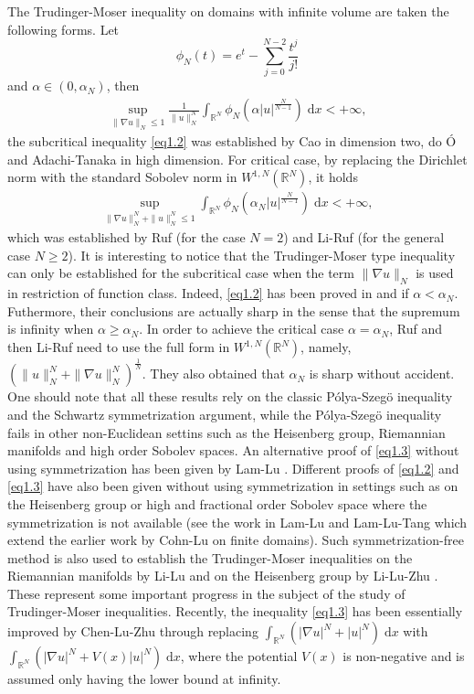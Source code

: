 \documentclass[11pt]{article}
\theoremstyle{plain}
\numberwithin{equation}{section}
\newcommand{\R}{\mathbb{R}}
\begin{document}
The Trudinger-Moser inequality on domains with infinite volume are taken the
following forms.
 Let
$$
\phi_{N}(t)=e^{t}-\sum\limits_{j=0}^{N-2}\frac{t^{j}}{j!}
$$
and $\alpha\in(0,\alpha_{N})$, then
\begin{align}
    \sup\limits_{\|\nabla u\|_{N}\leq 1}\frac{1}{\|u\|_{N}^{N}}\int_{\R^{N}}\phi_{N}(\alpha\lvert u\rvert^{\frac{N}{N-1}})\;\mathrm{d}x<+\infty,\label{eq1.2}
\end{align}
the subcritical inequality \eqref{eq1.2} was established by Cao \cite{Cao-1992} in dimension two, do \'{O} \cite{do-1997} and Adachi-Tanaka \cite{Adachi-Tanaka-2000} in high dimension. For critical case,  by replacing the Dirichlet norm with the standard Sobolev
norm in $W^{1, N}(\R^{N})$, it holds
\begin{align}
    \sup\limits_{\|\nabla u\|_{N}^{N}+\|u\|_{N}^{N}\leq 1}\int_{\R^{N}}\phi_{N}(\alpha_N\lvert u\rvert^{\frac{N}{N-1}})\;\mathrm{d}x<+\infty,\label{eq1.3}
\end{align}
which was established by Ruf \cite{Ruf-2005}(for the case $N=2$) and Li-Ruf \cite{Li-Ruf-2008}(for the general case $N\geq2$). It is interesting to notice that the Trudinger-Moser type inequality can only be established for the subcritical case when  the term $\|\nabla u\|_{N}$ is  used in restriction of function class. Indeed, \eqref{eq1.2} has been proved in \cite{do-1997} and \cite{Adachi-Tanaka-2000} if $\alpha<\alpha_{N}$. Futhermore, their conclusions are actually sharp in the sense that the supremum is infinity when $\alpha\geq\alpha_{N}$. In order to achieve the critical case $\alpha=\alpha_{N}$, Ruf \cite{Ruf-2005} and then Li-Ruf \cite{Li-Ruf-2008} need to use the full form in $W^{1,N}(\R^{N})$, namely, $(\|u\|_{N}^{N}+\|\nabla u\|_{N}^{N})^{\frac{1}{N}}$. They also obtained that $\alpha_{N}$ is sharp without accident. One should note that all these results rely on the classic P\'{o}lya-Szeg\"{o} inequality and the Schwartz symmetrization argument, while the P\'{o}lya-Szeg\"{o} inequality  fails in other non-Euclidean settins such as the Heisenberg group, Riemannian manifolds  and  high order Sobolev spaces.  An alternative proof of \eqref{eq1.3} without using symmetrization has been given by Lam-Lu \cite{Lam-Lu-2013}. Different proofs of \eqref{eq1.2} and \eqref{eq1.3} have also been given without using symmetrization in settings such as on the Heisenberg group or high and fractional order Sobolev space where the symmetrization is not available (see the work in Lam-Lu \cite{Lam-Lu-2012} and Lam-Lu-Tang \cite{Lam-Lu-Tang-2014} which extend the earlier work by Cohn-Lu \cite{Cohn-Lu-2001} on finite domains). Such symmetrization-free method is also used to establish the Trudinger-Moser inequalities on the Riemannian manifolds by Li-Lu \cite{Li-Lu-2021} and on the Heisenberg group by Li-Lu-Zhu \cite{Li-Lu-Zhu-2018}. These represent some important progress in the subject of the study of Trudinger-Moser inequalities. Recently,  the inequality \eqref{eq1.3} has been essentially improved by Chen-Lu-Zhu \cite{Chen-Lu-Zhu-2021, Chen-Lu-Zhu-2021'} through replacing $\int_{\mathbb
{R}^{N}}(\lvert\nabla u\rvert^{N}+\lvert u\rvert^{N})\;\mathrm{d}x$ with $\int_{\mathbb
{R}^{N}}(\lvert\nabla u\rvert^{N}+V(x)\lvert u\rvert^{N})\;\mathrm{d}x$, where the potential $V(x)$ is non-negative and is assumed only having the lower bound at infinity.
\end{document}
